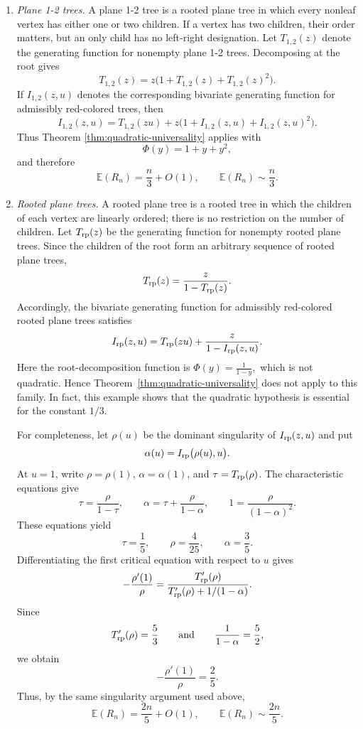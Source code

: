 \documentclass[11pt, onesided]{amsart}
\theoremstyle{remark}
\begin{document}
\begin{enumerate}

\item \emph{Plane 1-2 trees.}
A plane 1-2 tree is a rooted plane tree in which every nonleaf vertex has either one or two children. If a vertex has two children, their order matters, but an only child has no left-right designation. Let $T_{1,2}(z)$ denote the generating function for nonempty plane 1-2 trees. Decomposing at the root gives
\[
T_{1,2}(z)=z\bigl(1+T_{1,2}(z)+T_{1,2}(z)^2\bigr).
\]
If $I_{1,2}(z,u)$ denotes the corresponding bivariate generating function for admissibly red-colored trees, then
\[
I_{1,2}(z,u)
=
T_{1,2}(zu)
+z\bigl(1+I_{1,2}(z,u)+I_{1,2}(z,u)^2\bigr).
\]
Thus Theorem \ref{thm:quadratic-universality} applies with
\[
\Phi(y)=1+y+y^2,
\]
and therefore
\[
\mathbb E(R_n)=\frac{n}{3}+O(1),
\qquad
\mathbb E(R_n)\sim \frac{n}{3}.
\]

\item \emph{Rooted plane trees.}
A rooted plane tree is a rooted tree in which the children of each vertex are linearly ordered; there is no restriction on the number of children. Let $T_{\rm rp}(z)$ be the generating function for nonempty rooted plane trees. Since the children of the root form an arbitrary sequence of rooted plane trees,
\[
T_{\rm rp}(z)
=
\frac{z}{1-T_{\rm rp}(z)}.
\]
Accordingly, the bivariate generating function for admissibly red-colored rooted plane trees satisfies
\[
I_{\rm rp}(z,u)
=
T_{\rm rp}(zu)
+
\frac{z}{1-I_{\rm rp}(z,u)}.
\]
Here the root-decomposition function is
$
\Phi(y)=\frac{1}{1-y},
$
which is not quadratic. Hence Theorem~\ref{thm:quadratic-universality} does not apply to this family. In fact, this example shows that the quadratic hypothesis is essential for the constant $1/3$.

For completeness, let $\rho(u)$ be the dominant singularity of $I_{\rm rp}(z,u)$ and put
\[
\alpha(u)=I_{\rm rp}\big(\rho(u),u\big).
\]
At $u=1$, write $\rho=\rho(1)$, $\alpha=\alpha(1)$, and $\tau=T_{\rm rp}(\rho)$. The characteristic equations give
\[
\tau=\frac{\rho}{1-\tau},
\qquad
\alpha=\tau+\frac{\rho}{1-\alpha},
\qquad
1=\frac{\rho}{(1-\alpha)^2}.
\]
These equations yield
\[
\tau=\frac15,
\qquad
\rho=\frac{4}{25},
\qquad
\alpha=\frac35.
\]
Differentiating the first critical equation with respect to $u$ gives
\[
-\frac{\rho'(1)}{\rho}
=
\frac{T_{\rm rp}'(\rho)}
{T_{\rm rp}'(\rho)+1/(1-\alpha)}.
\]
Since
\[
T_{\rm rp}'(\rho)=\frac53
\qquad\hbox{and}\qquad
\frac{1}{1-\alpha}=\frac52,
\]
we obtain
\[
-\frac{\rho'(1)}{\rho}=\frac25.
\]
Thus, by the same singularity argument used above,
\[
\mathbb E(R_n)=\frac{2n}{5}+O(1),
\qquad
\mathbb E(R_n)\sim\frac{2n}{5}.
\]


\end{enumerate}
\end{document}
